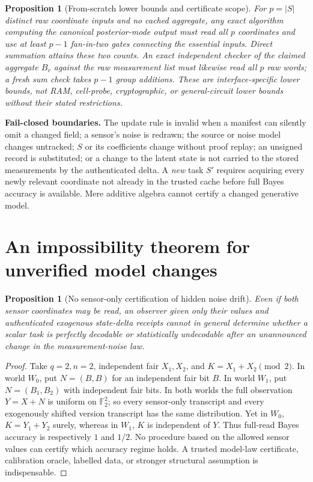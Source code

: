 \documentclass[11pt,letterpaper]{article}
\newtheorem{proposition}[theorem]{Proposition}
\newcommand{\F}{\mathbb F}
\begin{document}
\begin{proposition}[From-scratch lower bounds and certificate scope]
For \(p=|S|\) distinct raw coordinate inputs and no cached aggregate, any exact algorithm computing the canonical posterior-mode output must read all \(p\) coordinates and use at least \(p-1\) fan-in-two gates connecting the essential inputs. Direct summation attains these two counts. An exact independent checker of the claimed aggregate \(B_v\) against the raw measurement list must likewise read all \(p\) raw words; a fresh sum check takes \(p-1\) group additions. These are \emph{interface-specific} lower bounds, not RAM, cell-probe, cryptographic, or general-circuit lower bounds without their stated restrictions.
\end{proposition}

\noindent\textbf{Fail-closed boundaries.} The update rule is invalid when a manifest can silently omit a changed field; a sensor's noise is redrawn; the source or noise model changes untracked; \(S\) or its coefficients change without proof replay; an unsigned record is substituted; or a change to the latent state is not carried to the stored measurements by the authenticated delta. A \emph{new} task \(S'\) requires acquiring every newly relevant coordinate not already in the trusted cache before full Bayes accuracy is available. Mere additive algebra cannot certify a changed generative model.

\section{An impossibility theorem for unverified model changes}
\begin{proposition}[No sensor-only certification of hidden noise drift]\label{prop:drift}
Even if both sensor coordinates may be read, an observer given only their values and authenticated exogenous state-delta receipts cannot in general determine whether a scalar task is perfectly decodable or statistically undecodable after an unannounced change in the measurement-noise law.
\end{proposition}
\begin{proof}
Take \(q=2,n=2\), independent fair \(X_1,X_2\), and \(K=X_1+X_2\pmod2\). In world \(W_0\), put \(N=(B,B)\) for an independent fair bit \(B\). In world \(W_1\), put \(N=(B_1,B_2)\) with independent fair bits. In both worlds the full observation \(Y=X+N\) is uniform on \(\F_2^2\); so every sensor-only transcript and every exogenously shifted version transcript has the same distribution. Yet in \(W_0\), \(K=Y_1+Y_2\) surely, whereas in \(W_1\), \(K\) is independent of \(Y\). Thus full-read Bayes accuracy is respectively \(1\) and \(1/2\). No procedure based on the allowed sensor values can certify which accuracy regime holds. A trusted model-law certificate, calibration oracle, labelled data, or stronger structural assumption is indispensable.
\end{proof}
\end{document}
